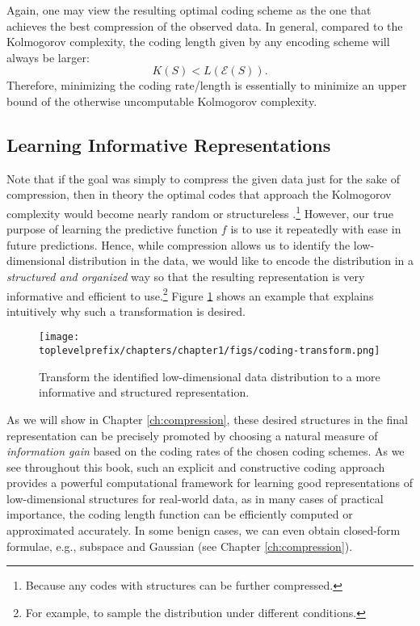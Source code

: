 \documentclass[../../book-main.tex]{subfiles}
\begin{document}
Again, one may view the resulting optimal coding scheme as the one that achieves the best compression of the observed data. In general, compared to the Kolmogorov complexity, the coding length given by any encoding scheme will always be larger: 
\begin{equation}
    K(S) < L( \mathcal E(S)).
\end{equation} 
Therefore, minimizing the coding rate/length is essentially to minimize an upper bound of the otherwise uncomputable Kolmogorov complexity. 

\subsection{Learning Informative Representations}
Note that if the goal was simply to compress the given data just for the sake of compression, then in theory the optimal codes that approach the Kolmogorov complexity would become nearly random or structureless \cite{Chaitin-1966}.\footnote{Because any codes with structures can be further compressed.} However, our true purpose of learning the predictive function $f$ is to use it repeatedly with ease in future predictions. Hence, while compression allows us to identify the low-dimensional distribution in the data, we would like to encode the distribution in a {\em structured and organized} way so that the resulting representation is very informative and efficient to use.\footnote{For example, to sample the distribution under different conditions.} Figure \ref{fig:expansion} shows an example that explains intuitively why such a transformation is desired. 

\begin{figure}
    \centering
    \texttt{[image: \\toplevelprefix/chapters/chapter1/figs/coding-transform.png]}
    \caption{Transform the identified low-dimensional data distribution to a more informative and structured representation.}
    \label{fig:expansion}
\end{figure}
As we will show in Chapter \ref{ch:compression}, these desired structures in the final representation can be precisely promoted by choosing a natural measure of {\em information gain} based on the coding rates of the chosen coding schemes. As we see throughout this book, such an explicit and constructive coding approach provides a powerful computational framework for learning good representations of low-dimensional structures for real-world data, as in many cases of practical importance, the coding length function can be efficiently computed or approximated accurately. In some benign cases, we can even obtain closed-form formulae, e.g., subspace and Gaussian (see Chapter \ref{ch:compression}). 
\end{document}

